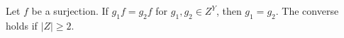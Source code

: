 Let $f$ be a surjection. If $g_1f = g_2f$ for $g_1, g_2 \in Z^Y$, then $g_1 = g_2$. The converse holds if $|Z| \geq 2$.
